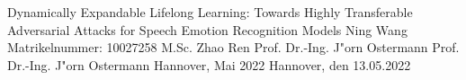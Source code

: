\documentclass[pdftex,a4paper,12pt]{scrreprt}
\begin{document}
             {Dynamically Expandable Lifelong Learning: Towards Highly Transferable Adversarial Attacks for Speech Emotion Recognition Models}  %
             {Ning Wang}    %
             {Matrikelnummer: 10027258}    %
             {M.Sc. Zhao Ren}    %
             {Prof. Dr.-Ing. J"orn Ostermann}%
             {Prof. Dr.-Ing. J"orn Ostermann}%
             {Hannover, Mai 2022}         %
             {Hannover, den 13.05.2022}    %


\setlength{\oddsidemargin}{1cm}
\setlength{\evensidemargin}{-1cm}




\tableofcontents

\listoftables

\listoffigures

\hypersetup{
    colorlinks = true,
    linkcolor=blue,          %
    citecolor=red,        %
    filecolor=magenta,      %
    urlcolor=cyan           %
}









\clearpage
\newpage



\end{document}
